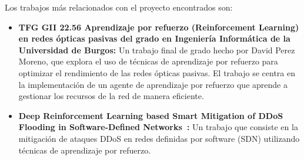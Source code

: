
Los trabajos más relacionados con el proyecto encontrados son:
 \begin{itemize}
    \item \textbf{TFG GII 22.56 Aprendizaje por refuerzo (Reinforcement Learning) en redes ópticas pasivas del grado en Ingeniería Informática de la Universidad de Burgos:} Un trabajo final de grado hecho por David Perez Moreno, que explora el uso de técnicas de aprendizaje por refuerzo para optimizar el rendimiento de las redes ópticas pasivas. El trabajo se centra en la implementación de un agente de aprendizaje por refuerzo que aprende a gestionar los recursos de la red de manera eficiente.
    \item \textbf{Deep Reinforcement Learning based Smart Mitigation of DDoS Flooding in Software-Defined Networks~\cite{Liu2018}:} Un trabajo que consiste en la mitigación de ataques DDoS en redes definidas por software (SDN) utilizando técnicas de aprendizaje por refuerzo.
\end{itemize}